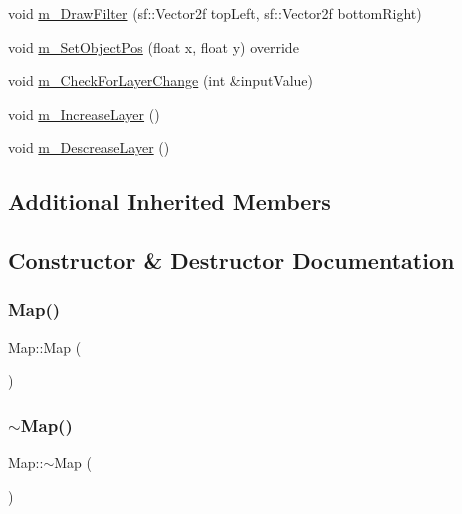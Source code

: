 \begin{DoxyCompactItemize}
\item 
void \mbox{\hyperlink{class_map_a47f69ae4c316d2efe45bd8a066e982c9}{m\+\_\+\+Draw\+Filter}} (sf\+::\+Vector2f top\+Left, sf\+::\+Vector2f bottom\+Right)
\item 
void \mbox{\hyperlink{class_map_aa44fadcea160127a186720c1ff44e533}{m\+\_\+\+Set\+Object\+Pos}} (float x, float y) override
\item 
void \mbox{\hyperlink{class_map_a024e4daa304e427c35119ae4baa01129}{m\+\_\+\+Check\+For\+Layer\+Change}} (int \&input\+Value)
\item 
void \mbox{\hyperlink{class_map_ae0ac864d328f94d30096184eb71e85cf}{m\+\_\+\+Increase\+Layer}} ()
\item 
void \mbox{\hyperlink{class_map_a59ab8311c6ea6ca42b00ae7e1ec2c10e}{m\+\_\+\+Descrease\+Layer}} ()
\end{DoxyCompactItemize}
\subsection*{Additional Inherited Members}


\subsection{Constructor \& Destructor Documentation}
\mbox{\label{class_map_a0f5ad0fd4563497b4214038cbca8b582}} 
\subsubsection{\texorpdfstring{Map()}{Map()}}
{\footnotesize\ttfamily Map\+::\+Map (\begin{DoxyParamCaption}{ }\end{DoxyParamCaption})}

\mbox{\label{class_map_aa403fbe09394ccf39747588f5168e3b2}} 
\subsubsection{\texorpdfstring{$\sim$\+Map()}{~Map()}}
{\footnotesize\ttfamily Map\+::$\sim$\+Map (\begin{DoxyParamCaption}{ }\end{DoxyParamCaption})}



